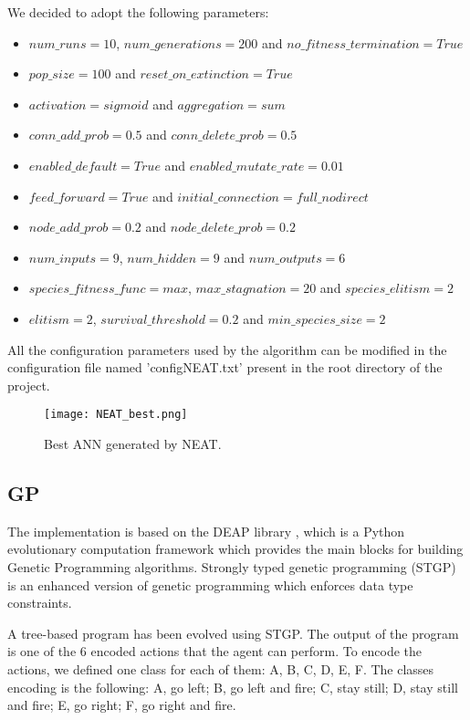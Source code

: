 We decided to adopt the following parameters:
\begin{itemize}
    \item $num\_runs = 10$, $num\_generations = 200$ and $no\_fitness\_termination = True$
    \item $pop\_size = 100$ and $reset\_on\_extinction = True$
    \item $activation = sigmoid$ and $aggregation = sum$
    \item $conn\_add\_prob = 0.5$ and $conn\_delete\_prob = 0.5$
    \item $enabled\_default = True$ and $enabled\_mutate\_rate = 0.01$
    \item $feed\_forward = True$ and $initial\_connection = full\_nodirect$
    \item $node\_add\_prob = 0.2$ and $node\_delete\_prob = 0.2$
    \item $num\_inputs = 9$, $num\_hidden = 9$ and $num\_outputs = 6$
    \item $species\_fitness\_func = max$, $max\_stagnation = 20$ and $species\_elitism = 2$
    \item $elitism = 2$, $survival\_threshold = 0.2$ and $min\_species\_size = 2$
\end{itemize}

All the configuration parameters used by the algorithm can be modified in the configuration
file named 'configNEAT.txt' present in the root directory of the project.



\begin{figure*}[htbp]
\centerline{\texttt{[image: NEAT\_best.png]}}
\caption{Best ANN generated by NEAT.}
\label{fig:NEAT_best}
\end{figure*}

\subsection{GP}
The implementation is based on the DEAP library \cite{DEAP}, which is a Python evolutionary
computation framework which provides the main blocks for building Genetic Programming
algorithms. Strongly typed genetic programming (STGP) is an enhanced version of genetic
programming which enforces data type constraints.

A tree-based program has been evolved using STGP. The output of the program is one of
the 6 encoded actions that the agent can perform. To encode the actions, we defined one
class for each of them: A, B, C, D, E, F. The classes encoding is the following:
A, go left; B, go left and fire; C, stay still; D, stay still and fire; E, go right; F, go right and fire.

